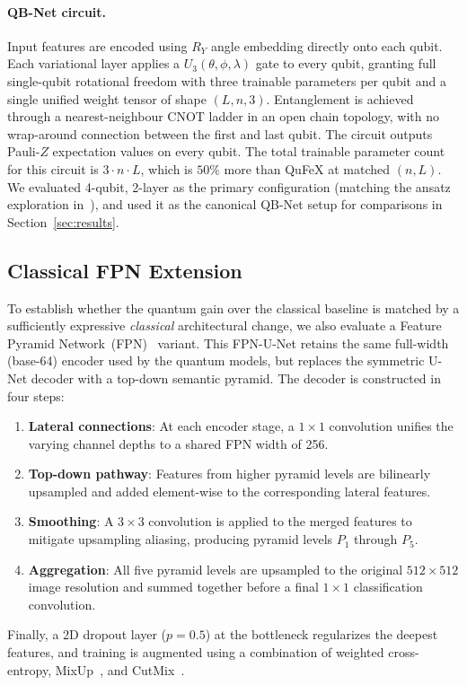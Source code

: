\documentclass{article}
\begin{document}
\paragraph{QB-Net circuit.} Input features are encoded using $R_Y$ angle embedding directly onto each qubit. Each variational layer applies a $U_3(\theta, \phi, \lambda)$ gate to every qubit, granting full single-qubit rotational freedom with three trainable parameters per qubit and a single unified weight tensor of shape $(L, n, 3)$. Entanglement is achieved through a nearest-neighbour CNOT ladder in an open chain topology, with no wrap-around connection between the first and last qubit. The circuit outputs Pauli-$Z$ expectation values on every qubit. The total trainable parameter count for this circuit is $3 \cdot n \cdot L$, which is $50\%$ more than QuFeX at matched $(n, L)$. We evaluated 4-qubit, 2-layer as the primary configuration (matching the ansatz exploration in~\cite{qbnet}), and used it as the canonical QB-Net setup for comparisons in Section~\ref{sec:results}.

\subsection{Classical FPN Extension}
\label{sec:fpn-method}

To establish whether the quantum gain over the classical baseline is matched by a sufficiently expressive \emph{classical} architectural change, we also evaluate a Feature Pyramid Network~(FPN)~\cite{fpn} variant. This FPN-U-Net retains the same full-width (base-64) encoder used by the quantum models, but replaces the symmetric U-Net decoder with a top-down semantic pyramid. The decoder is constructed in four steps:
\begin{enumerate}[leftmargin=2em,topsep=2pt,itemsep=0pt]
    \item \textbf{Lateral connections}: At each encoder stage, a $1\times1$ convolution unifies the varying channel depths to a shared FPN width of 256.
    \item \textbf{Top-down pathway}: Features from higher pyramid levels are bilinearly upsampled and added element-wise to the corresponding lateral features.
    \item \textbf{Smoothing}: A $3\times3$ convolution is applied to the merged features to mitigate upsampling aliasing, producing pyramid levels $P_1$ through $P_5$.
    \item \textbf{Aggregation}: All five pyramid levels are upsampled to the original $512\times512$ image resolution and summed together before a final $1\times1$ classification convolution.
\end{enumerate}
Finally, a 2D dropout layer ($p=0.5$) at the bottleneck regularizes the deepest features, and training is augmented using a combination of weighted cross-entropy, MixUp~\cite{mixup}, and CutMix~\cite{cutmix}. 
\end{document}

